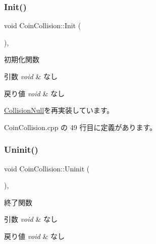 \subsubsection{\texorpdfstring{Init()}{Init()}}
{\footnotesize\ttfamily void Coin\+Collision\+::\+Init (\begin{DoxyParamCaption}{ }\end{DoxyParamCaption})\hspace{0.3cm}{\ttfamily [override]}, {\ttfamily [virtual]}}



初期化関数 


\begin{DoxyParams}{引数}
{\em void} & なし \\
\hline
\end{DoxyParams}

\begin{DoxyRetVals}{戻り値}
{\em void} & なし \\
\hline
\end{DoxyRetVals}


\mbox{\hyperlink{class_collision_null_a18cfc21fefcd3e8dec380ac44a85f111}{Collision\+Null}}を再実装しています。



 Coin\+Collision.\+cpp の 49 行目に定義があります。

\mbox{\label{class_coin_collision_aa852afdcdbedcf82809df9c7fd99be9e}} 
\subsubsection{\texorpdfstring{Uninit()}{Uninit()}}
{\footnotesize\ttfamily void Coin\+Collision\+::\+Uninit (\begin{DoxyParamCaption}{ }\end{DoxyParamCaption})\hspace{0.3cm}{\ttfamily [override]}, {\ttfamily [virtual]}}



終了関数 


\begin{DoxyParams}{引数}
{\em void} & なし \\
\hline
\end{DoxyParams}

\begin{DoxyRetVals}{戻り値}
{\em void} & なし \\
\hline
\end{DoxyRetVals}


